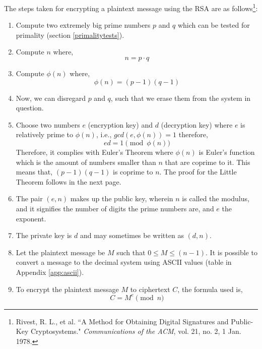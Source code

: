 \documentclass[a4paper,12pt]{article}
\theoremstyle{definition}
\begin{document}
The steps taken for encrypting a plaintext message using the RSA are as follows\footnote{Rivest, R. L., et al. ``A Method for Obtaining Digital Signatures and Public-Key Cryptosystems." \textit{Communications of the ACM}, vol. 21, no. 2, 1 Jan. 1978.}:
\begin{enumerate}
	\item Compute two extremely big prime numbers $p$ and $q$ which can be tested for primality (section \ref{primalitytests}).
	\item Compute $n$ where,
		\begin{equation} \label{primeproduct}
			n=p \cdot q
		\end{equation}
	\item Compute $\phi(n)$ where, 
		\begin{equation} \label{phi}
			\phi(n) = (p-1)(q-1)
		\end{equation}
	\item Now, we can disregard $p$ and $q$, such that we erase them from the system in question.
	\item Choose two numbers $e$ (encryption key) and $d$ (decryption key) where $e$ is relatively prime to $\phi(n)$, i.e., $gcd(e,\phi(n))=1$ therefore,
		\begin{equation} \label{ed}
			ed = 1 \pmod{\phi(n)}
		\end{equation}
		Therefore, it complies with Euler's Theorem where $\phi (n)$ is Euler's function which is the amount of numbers smaller than $n$ that are coprime to it. This means that, $(p-1)(q-1)$ is coprime to $n$. The proof for the Little Theorem follows in the next page.
	\item The pair $(e,n)$ makes up the public key, wherein $n$ is called the modulus, and it signifies the number of digits the prime numbers are, and $e$ the exponent.
	\item The private key is $d$ and may sometimes be written as $(d,n).$
	\item Let the plaintext message be $M$ such that $0\leq M \leq (n-1)$. It is possible to convert a message to the decimal system using ASCII values (table in Appendix \ref{app:ascii}). 
	\item To encrypt the plaintext message $M$ to ciphertext $C$, the formula used is,
		\begin{equation} \label{rsaencryption}
			C = M^e\pmod n
		\end{equation}
\end{enumerate}
\end{document}
